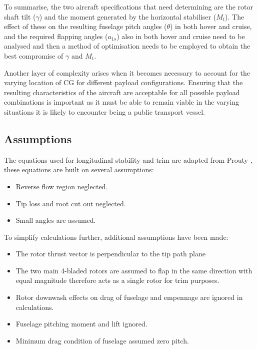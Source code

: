 \documentclass[11pt,a4paper]{article}
\begin{document}
To summarise, the two aircraft specifications that need determining are the rotor shaft tilt ($\gamma$) and the moment generated by the horizontal stabiliser ($M_t$). The effect of these on the resulting fuselage pitch angles ($\theta$) in both hover and cruise, and the required flapping angles ($a_{1s}$) also in both hover and cruise need to be analysed and then a method of optimisation needs to be employed to obtain the best compromise of $\gamma$ and $M_t$.

Another layer of complexity arises when it becomes necessary to account for the varying location of CG for different payload configurations. Ensuring that the resulting characteristics of the aircraft are acceptable for all possible payload combinations is important as it must be able to remain viable in the varying situations it is likely to encounter being a public transport vessel.
\subsection{Assumptions}

The equations used for longitudinal stability and trim are adapted from Prouty \cite{prouty}, these equations are built on several assumptions:

\begin{itemize}
    \item Reverse flow region neglected.
    \item Tip loss and root cut out neglected.
    \item Small angles are assumed.
\end{itemize}{}

To simplify calculations further, additional assumptions have been made:

\begin{itemize}
    \item The rotor thrust vector is perpendicular to the tip path plane
    \item The two main 4-bladed rotors are assumed to flap in the same direction with equal magnitude therefore acts as a single rotor for trim purposes.
    \item Rotor downwash effects on drag of fuselage and empennage are ignored in calculations.
    \item Fuselage pitching moment and lift ignored.
    \item Minimum drag condition of fuselage assumed zero pitch.
\end{itemize}{}
\end{document}
